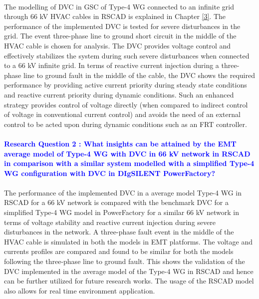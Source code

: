 \paragraph{} The modelling of \gls{DVC} in \gls{GSC} of Type-4 \gls{WG} connected to an infinite grid through 66 kV \gls{HVAC} cables in RSCAD is explained in Chapter \ref{3}. The performance of the implemented \gls{DVC} is tested for severe disturbances in the grid. The event three-phase line to ground short circuit in the middle of the \gls{HVAC} cable is chosen for analysis. The \gls{DVC} provides voltage control and effectively stabilizes the system during such severe disturbances when connected to a 66 kV infinite grid. In terms of reactive current injection during a three-phase line to ground fault in the middle of the cable, the \gls{DVC} shows the required performance by providing active current priority during steady state conditions and reactive current priority during dynamic conditions. Such an enhanced strategy provides control of voltage directly (when compared to indirect control of voltage in conventional current control) and avoids the need of an external control to be acted upon during dynamic conditions such as an FRT controller. 

\paragraph{\textcolor{blue}{Research Question 2 : What insights can be attained by the \gls{EMT} average model of Type-4 \gls{WG} with \gls{DVC} in 66 kV network in RSCAD in comparison with a similar system modelled with a simplified Type-4 \gls{WG} configuration with \gls{DVC} in DIgSILENT PowerFactory?}}

\paragraph{} The performance of the implemented \gls{DVC} in a average model Type-4 \gls{WG} in RSCAD for a 66 kV network is compared with the benchmark \gls{DVC} for a simplified Type-4 \gls{WG} model in PowerFactory for a similar 66 kV network in terms of voltage stability and reactive current injection during severe disturbances in the network. A three-phase fault event in the middle of the \gls{HVAC} cable is simulated in both the models in \gls{EMT} platforms. The voltage and currents profiles are compared and found to be similar for both the models following the three-phase line to ground fault. This shows the validation of the \gls{DVC} implemented in the average model of the Type-4 \gls{WG} in RSCAD and hence can be further utilized for future research works. The usage of the RSCAD model also allows for real time environment application.    

